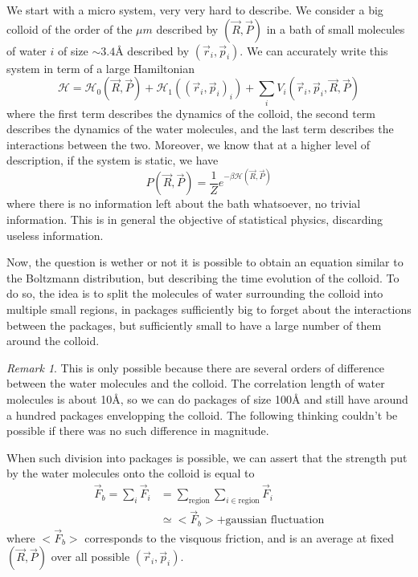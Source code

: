 \documentclass[a4paper]{book}
\theoremstyle{definition}
\theoremstyle{remark}
\newtheorem*{remark}{Remark}
\begin{document}
We start with a micro system, very very hard to describe. We consider a big colloid of the order of the $\mu m$ described by $(\vec{R}, \vec{P})$ in a bath of small molecules of water $i$ of size $\sim 3.4$\r{A} described by $(\vec{r}_i, \vec{p}_i)$. We can accurately write this system in term of a large Hamiltonian 
\begin{equation}
    \mathscr{H} = \mathscr{H}_0(\vec{R}, \vec{P}) + \mathscr{H}_1((\vec{r}_i, \vec{p}_i)_i) + \sum_i V_i(\vec{r}_i, \vec{p}_i, \vec{R}, \vec{P})
\end{equation}
where the first term describes the dynamics of the colloid, the second term describes the dynamics of the water molecules, and the last term describes the interactions between the two. Moreover, we know that at a higher level of description, if the system is static, we have 
\begin{equation}
    P(\vec{R}, \vec{P}) = \frac{1}{Z} e^{-\beta \mathscr{H}(\vec{R}, \vec{P})}
\end{equation}
where there is no information left about the bath whatsoever, no trivial information. This is in general the objective of statistical physics, discarding useless information. \par \medskip 
Now, the question is wether or not it is possible to obtain an equation similar to the Boltzmann distribution, but describing the time evolution of the colloid. To do so, the idea is to split the molecules of water surrounding the colloid into multiple small regions, in packages sufficiently big to forget about the interactions between the packages, but sufficiently small to have a large number of them around the colloid. 
\begin{remark}
    This is only possible because there are several orders of difference between the water molecules and the colloid. The correlation length of water molecules is about 10\r{A}, so we can do packages of size 100\r{A} and still have around a hundred packages envelopping the colloid. The following thinking couldn't be possible if there was no such difference in magnitude.
\end{remark}

When such division into packages is possible, we can assert that the strength put by the water molecules onto the colloid is equal to 
\begin{equation}
    \begin{aligned}
        \vec{F}_b = \sum_i \vec{F}_i &= \sum_{\text{region}} \sum_{i \in \text{region}} \vec{F}_i  \\
        &\simeq <\vec{F}_b> + \text{gaussian fluctuation}
    \end{aligned}
\end{equation}
where $<\vec{F}_b>$ corresponds to the visquous friction, and is an average at fixed $(\vec{R}, \vec{P})$ over all possible $(\vec{r}_i, \vec{p}_i)$. \par \medskip 
\end{document}
